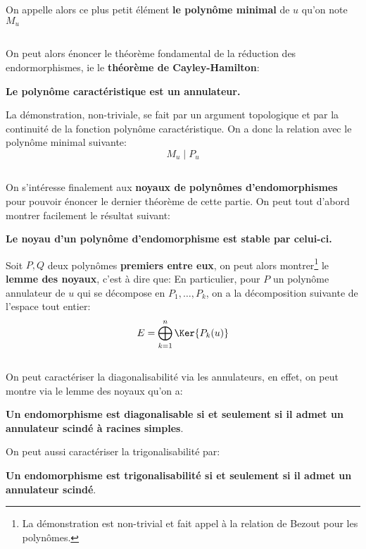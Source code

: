 On appelle alors ce plus petit élément \textbf{le polynôme minimal} de \(u\) qu'on note \(M_u\)
\subsection*{}
On peut alors énoncer le théorème fondamental de la réduction des endormorphismes, ie le \textbf{théorème de Cayley-Hamilton}:
\begin{center}
   \textbf{Le polynôme caractéristique est un annulateur.}
\end{center}
La démonstration, non-triviale, se fait par un argument topologique et par la continuité de la fonction polynôme caractéristique. On a donc la relation avec le polynôme minimal suivante:
\[
   M_u \; | \; P_u   
\]
\subsection*{}
On s'intéresse finalement aux \textbf{noyaux de polynômes d'endomorphismes} pour pouvoir énoncer le dernier théorème de cette partie. On peut tout d'abord montrer facilement le résultat suivant:
\begin{center}
   \textbf{Le noyau d'un polynôme d'endomorphisme est stable par celui-ci.}
\end{center}
Soit \(P, Q\) deux polynômes \textbf{premiers entre eux}, on peut alors montrer\footnote[1]{La démonstration est non-trivial et fait appel à la relation de Bezout pour les polynômes.} le \textbf{lemme des noyaux}, c'est à dire que:
En particulier, pour \(P\) un polynôme annulateur de \(u\) qui se décompose en \(P_1, \ldots, P_k\), on a la décomposition suivante de l'espace tout entier:
\[
   E = \bigoplus_{k=1}^n \Ker{P_k(u)}
\]
\subsection*{}
On peut caractériser la diagonalisabilité via les annulateurs, en effet, on peut montre via le lemme des noyaux qu'on a:
\begin{center}
   \textbf{Un endomorphisme est diagonalisable si et seulement si il admet un annulateur scindé à racines simples}.
\end{center}
On peut aussi caractériser la trigonalisabilité par:
\begin{center}
   \textbf{Un endomorphisme est trigonalisabilité si et seulement si il admet un annulateur scindé}.
\end{center}
